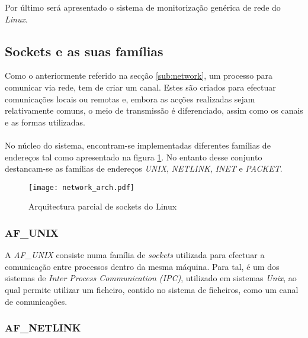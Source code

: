 Por último será apresentado o sistema de monitorização genérica de rede do \textit{Linux}.

 
\subsection{Sockets e as suas famílias}
\label{sub:sockets}

Como o anteriormente referido na secção \ref{sub:network}, um processo para comunicar via rede, tem de criar um canal.
Estes são criados para efectuar comunicações locais ou remotas e, embora as acções realizadas sejam relativamente comuns, o meio de transmissão é diferenciado, assim como os canais e as formas utilizadas.

\paragraph*{}

No núcleo do sistema, encontram-se implementadas diferentes famílias de endereços tal como apresentado na figura \ref{fig:network_arch}.
No entanto desse conjunto destancam-se as famílias de endereços \textit{UNIX}, \textit{NETLINK}, \textit{INET} e \textit{PACKET}.\cite{ULNI,TLNA}

\begin{figure}[!htbp]
\centering
\texttt{[image: network\_arch.pdf]} 
\caption{Arquitectura parcial de sockets do Linux}
\label{fig:network_arch}
\end{figure}

\subsubsection{AF\_UNIX}

A \textit{AF\_UNIX} consiste numa família de \textit{sockets} utilizada para efectuar a comunicação entre processos dentro da mesma máquina.
Para tal, é um dos sistemas de \textit{Inter Process Communication (IPC)}, utilizado em sistemas \textit{Unix}, ao qual permite utilizar um ficheiro, contido no sistema de ficheiros, como um canal de comunicações.

\subsubsection{AF\_NETLINK}

